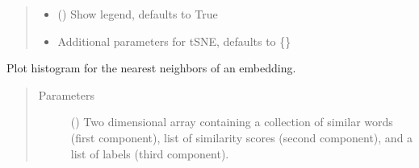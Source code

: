 \documentclass[letterpaper,10pt,english]{sphinxmanual}
\begin{document}
\begin{fulllineitems}
\begin{quote}
\begin{description}
\begin{itemize}
\item {} 
 (\sphinxstyleliteralemphasis{\sphinxupquote{, }}) \textendash{} Show legend, defaults to True

\item {} 
 \textendash{} Additional parameters for t\sphinxhyphen{}SNE,
defaults to \{\}

\end{itemize}

\end{description}\end{quote}

\end{fulllineitems}


\begin{fulllineitems}
\label{\detokenize{code:code_utils.plotter.histogram_embeddings_nn}}
Plot histogram for the nearest neighbors of an embedding.
\begin{quote}\begin{description}
\item[{Parameters}] \leavevmode
{} () \textendash{} Two dimensional array containing a collection of similar
words (first component), list of similarity scores (second component),
and a list of labels (third component).

\end{description}\end{quote}

\end{fulllineitems}

\end{document}
